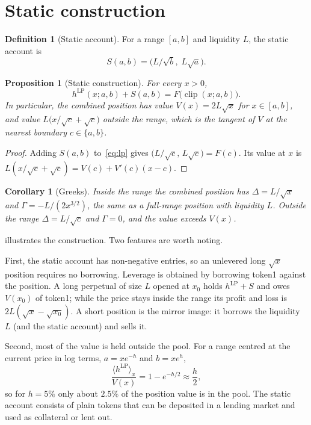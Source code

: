 \documentclass[11pt]{article}
\newtheorem{proposition}{Proposition}
\newtheorem{corollary}{Corollary}
\theoremstyle{definition}
\newtheorem{definition}{Definition}
\theoremstyle{remark}
\newcommand{\clip}{\operatorname{clip}}
\newcommand{\val}[2]{\langle #1\rangle_{#2}}
\newcommand{\hLP}{h^{\mathrm{LP}}}
\begin{document}
\section{Static construction}\label{sec:static}

\begin{definition}[Static account]
For a range $[a,b]$ and liquidity $L$, the static account is
\[
  S(a,b) = \bigl(L/\sqrt{b},\; L\sqrt{a}\bigr).
\]
\end{definition}

\begin{proposition}[Static construction]\label{prop:static}
For every $x>0$,
\[
  \hLP(x;a,b) + S(a,b) = F\bigl(\clip(x;a,b)\bigr).
\]
In particular, the combined position has value $V(x)=2L\sqrt{x}$ for $x\in[a,b]$, and value $L\bigl(x/\sqrt{c}+\sqrt{c}\bigr)$ outside the range, which is the tangent of $V$ at the nearest boundary $c\in\{a,b\}$.
\end{proposition}

\begin{proof}
Adding $S(a,b)$ to~\eqref{eq:lp} gives $\bigl(L/\sqrt{c},\,L\sqrt{c}\bigr)=F(c)$. Its value at $x$ is $L(x/\sqrt{c}+\sqrt{c}) = V(c)+V'(c)(x-c)$.
\end{proof}

\begin{corollary}[Greeks]\label{cor:greeks}
Inside the range the combined position has $\Delta = L/\sqrt{x}$ and $\Gamma = -L/(2x^{3/2})$, the same as a full-range position with liquidity $L$. Outside the range $\Delta = L/\sqrt{c}$ and $\Gamma=0$, and the value exceeds $V(x)$.
\end{corollary}

 illustrates the construction. Two features are worth noting.

First, the static account has non-negative entries, so an unlevered long $\sqrt{x}$ position requires no borrowing. Leverage is obtained by borrowing token1 against the position. A long perpetual of size $L$ opened at $x_0$ holds $\hLP+S$ and owes $V(x_0)$ of token1; while the price stays inside the range its profit and loss is $2L(\sqrt{x}-\sqrt{x_0})$. A short position is the mirror image: it borrows the liquidity $L$ (and the static account) and sells it.

Second, most of the value is held outside the pool. For a range centred at the current price in log terms, $a=xe^{-h}$ and $b=xe^{h}$,
\begin{equation}\label{eq:pool-share}
  \frac{\val{\hLP}{x}}{V(x)} = 1-e^{-h/2} \approx \frac{h}{2},
\end{equation}
so for $h=5\%$ only about $2.5\%$ of the position value is in the pool. The static account consists of plain tokens that can be deposited in a lending market and used as collateral or lent out.
\end{document}
